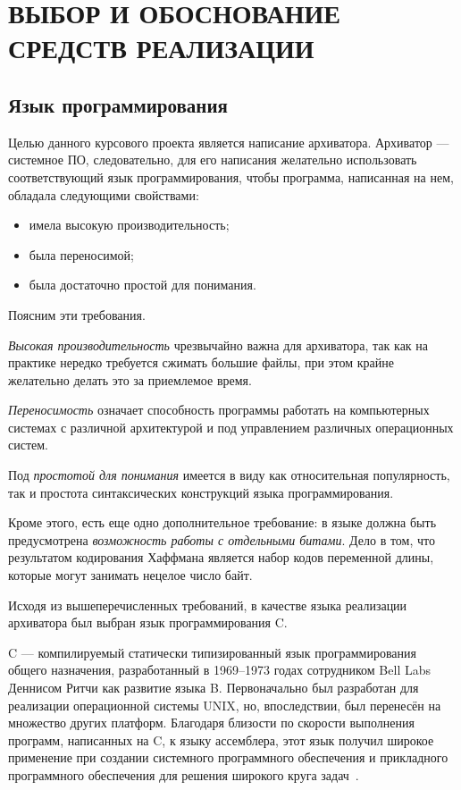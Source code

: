 \section[Выбор и обоснование средств реализации]{ВЫБОР И ОБОСНОВАНИЕ \\ СРЕДСТВ РЕАЛИЗАЦИИ}
\label{sec:choice}

\subsection{Язык программирования}

Целью данного курсового проекта является написание архиватора.
Архиватор --- системное ПО, следовательно, для его написания желательно
использовать соответствующий язык программирования, 
чтобы программа, написанная на нем, обладала следующими свойствами:

\begin{itemize}
\item имела высокую производительность;
\item была переносимой;
\item была достаточно простой для понимания.
\end{itemize}

Поясним эти требования.

\textit{Высокая производительность} чрезвычайно важна для архиватора,
так как на практике нередко требуется сжимать большие файлы,
при этом крайне желательно делать это за приемлемое время.

\textit{Переносимость} означает способность программы работать на
компьютерных системах с различной архитектурой и под управлением 
различных операционных систем.

Под \textit{простотой для понимания} имеется в виду как относительная 
популярность, так и простота синтаксических конструкций языка программирования.

Кроме этого, есть еще одно дополнительное требование:
в языке должна быть предусмотрена \textit{возможность работы с отдельными битами}.
Дело в том, что результатом кодирования Хаффмана является набор кодов 
переменной длины, которые могут занимать нецелое число байт. 

Исходя из вышеперечисленных требований, в качестве языка реализации
архиватора был выбран язык программирования C.

C --- компилируемый статически типизированный язык программирования общего
назначения, разработанный в 1969--1973 годах сотрудником Bell Labs
Деннисом Ритчи как развитие языка B.
Первоначально был разработан для реализации операционной системы UNIX,
но, впоследствии, был перенесён на множество других платформ.
Благодаря близости по скорости выполнения программ, написанных на C,
к языку ассемблера, этот язык получил широкое применение при создании
системного программного обеспечения и прикладного программного
обеспечения для решения широкого круга задач~\cite{wiki_c}.

